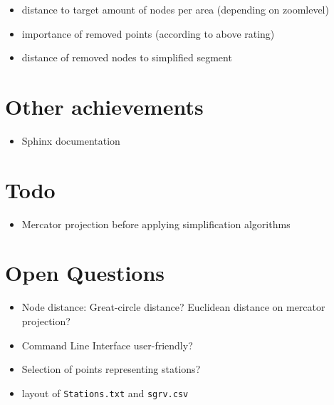 \documentclass[twoside]{scrartcl}
\begin{document}
\begin{itemize}
\item distance to target amount of nodes per area (depending on zoomlevel)
\item importance of removed points (according to above rating)
\item distance of removed nodes to simplified segment
\end{itemize}

\section{Other achievements}
\begin{itemize}
    \item Sphinx documentation
\end{itemize}

\section{Todo}
\begin{itemize}
    \item Mercator projection before applying simplification algorithms
\end{itemize}

\section{Open Questions}
\begin{itemize}
    \item Node distance: Great-circle distance? Euclidean distance on mercator projection?
    \item Command Line Interface user-friendly?
    \item Selection of points representing stations?
    \item layout of \texttt{Stations.txt} and \texttt{sgrv.csv}
\end{itemize}

\newpage
\end{document}

